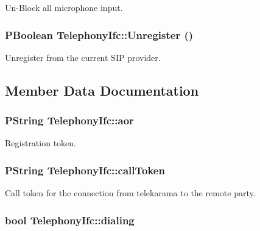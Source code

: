 Un-Block all microphone input. 

\hypertarget{classTelephonyIfc_957da4a7936c3672a48f0fa93f655676}{
\subsubsection[{Unregister}]{\setlength{\rightskip}{0pt plus 5cm}PBoolean TelephonyIfc::Unregister ()}}
\label{classTelephonyIfc_957da4a7936c3672a48f0fa93f655676}


Unregister from the current SIP provider. 



\subsection{Member Data Documentation}
\hypertarget{classTelephonyIfc_b4e274c6a138a5e08ead646eda38613e}{
\subsubsection[{aor}]{\setlength{\rightskip}{0pt plus 5cm}PString {\bf TelephonyIfc::aor}}}
\label{classTelephonyIfc_b4e274c6a138a5e08ead646eda38613e}


Registration token. 

\hypertarget{classTelephonyIfc_3541fbc8e53e233226678ef3033b591f}{
\subsubsection[{callToken}]{\setlength{\rightskip}{0pt plus 5cm}PString {\bf TelephonyIfc::callToken}}}
\label{classTelephonyIfc_3541fbc8e53e233226678ef3033b591f}


Call token for the connection from telekarama to the remote party. 

\hypertarget{classTelephonyIfc_0ffb35f802c55694b5729e5bde971483}{
\subsubsection[{dialing}]{\setlength{\rightskip}{0pt plus 5cm}bool {\bf TelephonyIfc::dialing}}}
\label{classTelephonyIfc_0ffb35f802c55694b5729e5bde971483}


